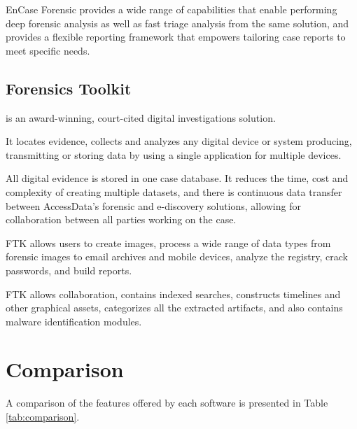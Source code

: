 EnCase Forensic provides a wide range of capabilities that enable performing deep forensic analysis as well as fast triage analysis from the same solution, and provides a flexible
reporting framework that empowers tailoring case reports to meet specific needs.

\subsection{Forensics Toolkit}

 \cite{ftk} is an award-winning, court-cited digital investigations solution. 

It locates evidence, collects and analyzes any digital device or system producing, transmitting or 
storing data by using a single application for multiple devices.

All digital evidence is stored in one case database. It reduces the time, cost and complexity of creating multiple datasets, and there is continuous data transfer between AccessData's forensic 
and e-discovery solutions, allowing for collaboration between all parties working on the case. 

FTK allows users to create images, process a wide range of data types from forensic images to email archives and 
mobile devices, analyze the registry, crack passwords, and build reports. 

FTK allows collaboration, contains indexed searches, constructs timelines and other graphical assets, categorizes all the extracted artifacts, and also contains malware identification modules.

\section{Comparison}

A comparison of the features offered by each software is presented in Table \ref{tab:comparison}.

